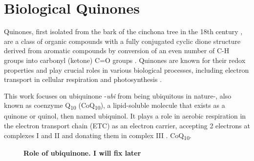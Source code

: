 \section{Biological Quinones}
Quinones, first isolated from the bark of the cinchona tree in the 18th century \cite{rusell1873quinone}, are a class of organic compounds with a fully conjugated cyclic dione structure derived from aromatic compounds by conversion of an even number of C-H groups into carbonyl (ketone) C=O groups \cite{IUPACQ050152025}. Quinones are known for their redox properties and play crucial roles in various biological processes, including electron transport in cellular respiration and photosynthesis \cite{ernster1995biochemical,chen2024low}.

This work focuses on ubiquinone -\textit{ubi} from being ubiquitous in nature-, also known as coenzyme Q\textsubscript{10} (CoQ\textsubscript{10}), a lipid-soluble molecule that exists as a quinone or quinol, then named ubiquinol. It plays a role in aerobic respiration in the electron transport chain (ETC) as an electron carrier, accepting 2 electrons at complexes I and II and donating them in complex III \cite{ernster1995biochemical}. CoQ\textsubscript{10}.

\begin{figure}[hb!]
  \centering
  \caption[Role of ubiquinone]{\textbf{Role of ubiquinone. I will fix later}}
  \label{fig:QuinoneTypes}
\end{figure}

